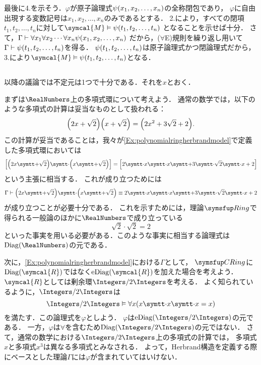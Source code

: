 最後に4.を示そう．\(\varphi\)が原子論理式\(\apply{\psi}{x_1, x_2, \dots, x_n}\)の全称閉包であり，
\(\varphi\)に自由出現する変数記号は\(x_1, x_2, \dots, x_n\)のみであるとする．
2.により，すべての閉項\(t_1, t_2, \dots, t_n\)に対して\(\symcal{M} \satisfy \apply{\psi}{t_1, t_2, \dots, t_n}\)
となることを示せば十分．
さて，\(\Gamma \provable \forall x_1 \forall x_2 \dotsb \forall x_n \apply{\psi}{x_1, x_2, \dots, x_n}\)
だから，(\(\forall\)E)規則を繰り返し用いて
\(\Gamma \provable \apply{\psi}{t_1, t_2, \dots, t_n}\)を得る．
\(\apply{\psi}{t_1, t_2, \dots, t_n}\)は原子論理式かつ閉論理式だから，3.により\(\symcal{M} \satisfy \apply{\psi}{t_1, t_2, \dots, t_n}\)となる．


\subsection*{}

以降の議論では不定元は1つで十分である．それを\(x\)とおく．

まずは\(\RealNumbers\)上の多項式環について考えよう．
通常の数学では，以下のような多項式の計算は妥当なものとして扱われる：
\[
	\paren{2x + \sqrt{2}} \paren{x + \sqrt{2}} = \paren{2x^2 + 3 \sqrt{2} + 2}.
\]
この計算が妥当であることは，我々が\cref{Ex:polynomialringherbrandmodel}で定義した多項式環においては
\[
	\equivclass{\paren{2x \obj{+} \sqrt{2}} \obj{\cdot} \paren{x \obj{+} \sqrt{2}}}
	= \equivclass{2 \obj{\cdot} x \obj{\cdot} x \obj{+} 3 \obj{\cdot} \sqrt{2} \obj{\cdot} x + 2}
\]
という主張に相当する．
これが成り立つためには
\[
	\Gamma \provable
	\paren{2x \obj{+} \sqrt{2}} \obj{\cdot} \paren{x \obj{+} \sqrt{2}}
	\objeq
	2 \obj{\cdot} x \obj{\cdot} x \obj{+} 3 \obj{\cdot} \sqrt{2} \obj{\cdot} x + 2
\]
が成り立つことが必要十分である．
これを示すためには，理論\(\Ring\)で得られる一般論のほかに\(\RealNumbers\)で成り立っている
\[
	\sqrt{2} \cdot \sqrt{2} = 2
\]
といった事実を用いる必要がある．このような事実に相当する論理式は
\(\apply{\Diag}{\RealNumbers}\)の元である．

次に，\cref{Ex:polynomialringherbrandmodel}における\(\Gamma\)として，
\(\CRing\)に\(\apply{\Diag}{\symcal{R}}\)ではなく\(\apply{\eDiag}{\symcal{R}}\)を加えた場合を考えよう．
\(\symcal{R}\)としては剰余環\(\Integers/2\Integers\)を考える．
よく知られているように，\(\Integers/2\Integers\)は
\[
	\Integers/2\Integers \satisfy \forall x \paren{x \obj{\cdot} x \obj{\cdot} x = x}
\]
を満たす．この論理式を\(\varphi\)としよう．
\(\varphi\)は\(\apply{\eDiag}{\Integers/2\Integers}\)の元である．
一方，\(\varphi\)は\(\forall\)を含むため\(\apply{\Diag}{\Integers/2\Integers}\)の元ではない．
さて，通常の数学における\(\Integers/2\Integers\)上の多項式の計算では，
多項式\(x\)と多項式\(x^3\)は異なる多項式とみなされる．
よって，Herbrand構造を定義する際にベースとした理論\(\Gamma\)には\(\varphi\)が含まれていてはいけない．

